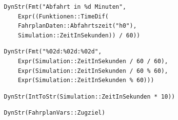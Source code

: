\begin{verbatim}
DynStr(Fmt("Abfahrt in %d Minuten",
    Expr((Funktionen::TimeDif(
    FahrplanDaten::Abfahrtszeit("h0"), 
    Simulation::ZeitInSekunden)) / 60))
\end{verbatim}

\begin{verbatim}
DynStr(Fmt("%02d:%02d:%02d", 
    Expr(Simulation::ZeitInSekunden / 60 / 60),
    Expr(Simulation::ZeitInSekunden / 60 % 60), 
    Expr(Simulation::ZeitInSekunden % 60)))
\end{verbatim}

\begin{verbatim}
DynStr(IntToStr(Simulation::ZeitInSekunden * 10))
\end{verbatim}

\begin{verbatim}
DynStr(FahrplanVars::Zugziel)
\end{verbatim}